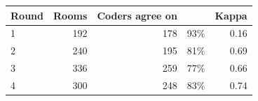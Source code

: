 \begin{tabular}{@{}lrrrr@{}}
\toprule
Round & Rooms & Coders agree on &  & Kappa \\
\midrule
1 & 192 & 178 & 93\% & 0.16 \\
2 & 240 & 195 & 81\% & 0.69 \\
3 & 336 & 259 & 77\% & 0.66 \\
4 & 300 & 248 & 83\% & 0.74 \\
\bottomrule
\end{tabular}
